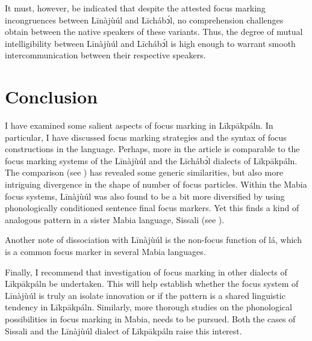 \documentclass[output=paper,colorlinks,citecolor=brown]{langscibook}
\begin{document}
It must, however, be indicated that despite the attested focus marking incongruences between Līnàjùúl and Līchábͻ́l, no comprehension challenges obtain between the native speakers of these variants. Thus, the degree of mutual intelligibility between Līnàjùúl and Līchábͻ́l is high enough to warrant smooth intercommunication between their respective speakers.

\section{Conclusion}\label{sec:bisilki:9}

I have examined some salient aspects of focus marking in Līkpākpáln. In particular, I have discussed focus marking strategies and the syntax of focus constructions in the language. Perhaps, more in the article is comparable to the focus marking systems of the Līnàjùúl and the Līchábͻ́l dialects of Līkpākpáln. The comparison (see ) has revealed some generic similarities, but also more intriguing divergence in the shape of number of focus particles. Within the Mabia focus systems, Līnàjùúl was also found to be a bit more diversified by using phonologically conditioned sentence final focus markers. Yet this finds a kind of analogous pattern in a sister Mabia language, Sissali (see ).

Another note of dissociation with Līnàjùúl is the non-focus function of lá, which is a common focus marker in several Mabia languages.

Finally, I recommend that investigation of focus marking in other dialects of Līkpākpáln be undertaken. This will help establish whether the focus system of Līnàjùúl is truly an isolate innovation or if the pattern is a shared linguistic tendency in Līkpākpáln. Similarly, more thorough studies on the phonological possibilities in focus marking in Mabia, needs to be pursued. Both the cases of Sissali and the Līnàjùúl dialect of Līkpākpáln raise this interest.
\end{document}
